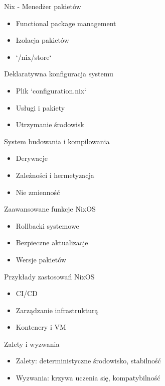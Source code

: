 \documentclass{beamer}
\begin{document}
\begin{frame}{Nix - Menedżer pakietów}
    \begin{itemize}
        \item Functional package management
        \item Izolacja pakietów
        \item `/nix/store`
    \end{itemize}
\end{frame}

\begin{frame}{Deklaratywna konfiguracja systemu}
    \begin{itemize}
        \item Plik `configuration.nix`
        \item Usługi i pakiety
        \item Utrzymanie środowisk
    \end{itemize}
\end{frame}

\begin{frame}{System budowania i kompilowania}
    \begin{itemize}
        \item Derywacje
        \item Zależności i hermetyzacja
        \item Nie zmienność
    \end{itemize}
\end{frame}

\begin{frame}{Zaawansowane funkcje NixOS}
    \begin{itemize}
        \item Rollbacki systemowe
        \item Bezpieczne aktualizacje
        \item Wersje pakietów
    \end{itemize}
\end{frame}

\begin{frame}{Przykłady zastosowań NixOS}
    \begin{itemize}
        \item CI/CD
        \item Zarządzanie infrastrukturą
        \item Kontenery i VM
    \end{itemize}
\end{frame}

\begin{frame}{Zalety i wyzwania}
    \begin{itemize}
        \item Zalety: deterministyczne środowisko, stabilność
        \item Wyzwania: krzywa uczenia się, kompatybilność
    \end{itemize}
\end{frame}
\end{document}
